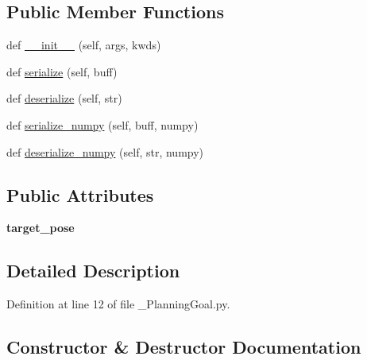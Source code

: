 \subsection*{Public Member Functions}
\begin{DoxyCompactItemize}
\item 
def \hyperlink{classmotion__plan_1_1msg_1_1__PlanningGoal_1_1PlanningGoal_abc9465bfd2736d082b9f536118d7272a}{\+\_\+\+\_\+init\+\_\+\+\_\+} (self, args, kwds)
\item 
def \hyperlink{classmotion__plan_1_1msg_1_1__PlanningGoal_1_1PlanningGoal_ab521b5fd374696fd89c2de67862d2906}{serialize} (self, buff)
\item 
def \hyperlink{classmotion__plan_1_1msg_1_1__PlanningGoal_1_1PlanningGoal_adffcada0f6843d09f27655ac73d0dff9}{deserialize} (self, str)
\item 
def \hyperlink{classmotion__plan_1_1msg_1_1__PlanningGoal_1_1PlanningGoal_abe139ea0c98d9f96627f5c0ed38781a3}{serialize\+\_\+numpy} (self, buff, numpy)
\item 
def \hyperlink{classmotion__plan_1_1msg_1_1__PlanningGoal_1_1PlanningGoal_a84aa86fc947477bc2aa11ac8e8fcaa2b}{deserialize\+\_\+numpy} (self, str, numpy)
\end{DoxyCompactItemize}
\subsection*{Public Attributes}
\begin{DoxyCompactItemize}
\item 
\mbox{\label{classmotion__plan_1_1msg_1_1__PlanningGoal_1_1PlanningGoal_a18438422e0658536780bab7012e8b30d}} 
{\bfseries target\+\_\+pose}
\end{DoxyCompactItemize}


\subsection{Detailed Description}


Definition at line 12 of file \+\_\+\+Planning\+Goal.\+py.



\subsection{Constructor \& Destructor Documentation}
\mbox{\label{classmotion__plan_1_1msg_1_1__PlanningGoal_1_1PlanningGoal_abc9465bfd2736d082b9f536118d7272a}} 
